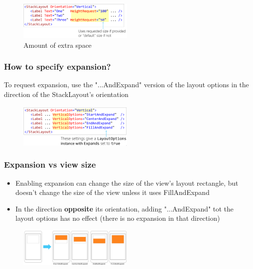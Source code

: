 \documentclass{article}
\newcommand{\bold}[1]{\textbf{#1}}
\begin{document}
\begin{figure}[H]
    \centering
    \includegraphics[width=0.5\textwidth]{xaml-expansion-space.png}
    \caption{Amount of extra space}
\end{figure}

\subsubsection{How to specify expansion?}

To request expansion, use the "...AndExpand" version of the layout options in the direction of the StackLayout's orientation

\begin{figure}[H]
    \centering
    \includegraphics[width=0.5\textwidth]{xaml-expansion-specify.png}
    \caption{}
\end{figure}

\subsubsection{Expansion vs view size}

\begin{itemize}
    \item Enabling expansion can change the size of the view's layout rectangle, but doesn't change the size of the view unless it uses FillAndExpand
    \item In the direction \bold{opposite} its orientation, adding "...AndExpand" tot the layout options has no effect (there is no expansion in that direction)
\end{itemize}

\begin{figure}[H]
    \centering
    \includegraphics[width=0.5\textwidth]{xaml-expansion-viewsize.png}
    \caption{}
\end{figure}
\end{document}
